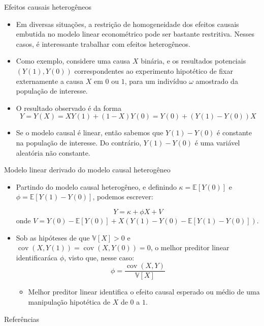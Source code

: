 \documentclass[11pt]{beamer}
\begin{document}
\begin{frame}{Efeitos causais heterogêneos}
\begin{itemize}
	\item 	Em diversas situações, a restrição de homogeneidade dos efeitos causais embutida no modelo linear econométrico pode ser bastante restritiva. Nesses casos, é interessante trabalhar com efeitos heterogêneos.
	\item Como exemplo, considere uma causa $X$ binária, e os resultados potenciais $(Y(1), Y(0))$ correspondentes ao experimento hipotético de fixar externamente a causa $X$ em $0$ ou $1$, para um indivíduo $\omega$ amostrado da população de interesse.
	\item O resultado observado é da forma $$Y = Y(X) = X Y(1) + (1-X)Y(0) = Y(0) + (Y(1)-Y(0))X$$
	\item Se o modelo causal é linear, então sabemos que $Y(1) - Y(0)$ é constante na população de interesse. Do contrário, $Y(1)-Y(0)$ é uma variável aleatória não constante.
\end{itemize}
\end{frame}
\begin{frame}{Modelo linear derivado do modelo causal heterogêneo}
\begin{itemize}
	 \item Partindo do modelo causal heterogêneo, e definindo $\kappa = \mathbb{E}[Y(0)]$ e $\phi = \mathbb{E}[Y(1)-Y(0)]$, podemos escrever:
	
	$$Y = \kappa + \phi X + V$$
	onde $V = Y(0)-\mathbb{E}[Y(0)] + X(Y(1)-Y(0)-\mathbb{E}[Y(1)-Y(0)])$.
	\item Sob as hipóteses de que $\mathbb{V}[X] > 0$ e $\operatorname{cov}(X,Y(1))= \operatorname{cov}(X,Y(0)) = 0$, o melhor preditor linear identificaráca $\phi$, visto que, nesse caso:
	$$\phi = \frac{\operatorname{cov}(X,Y)}{\mathbb{V}[X]}$$
	\begin{itemize}
		\item Melhor preditor linear identifica o efeito causal esperado ou médio de uma manipulação hipotética de $X$ de $0$ a $1$.
	\end{itemize}
\end{itemize}
\end{frame}
\appendix
\begin{frame}{Referências}
	\printbibliography
\end{frame}
\end{document}

